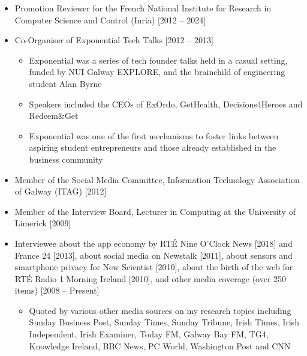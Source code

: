 \documentclass[10pt,a4paper]{res} %
\begin{document}
\begin{resume}
\begin{itemize}
\item Promotion Reviewer for the French National Institute for Research in Computer Science and Control (Inria) [2012 -- 2024]
\item Co-Organiser of Exponential Tech Talks [2012 -- 2013]
\begin{itemize} \itemsep -2pt
\item Exponential was a series of tech founder talks held in a casual setting, funded by NUI Galway EXPLORE, and the brainchild of engineering student Alan Byrne
\item Speakers included the CEOs of ExOrdo, GetHealth, Decisions4Heroes and Redeem\&Get
\item Exponential was one of the first mechanisms to foster links between aspiring student entrepreneurs and those already established in the business community
\end{itemize}
\item Member of the Social Media Committee, Information Technology Association of Galway (ITAG) [2012]
\item Member of the Interview Board, Lecturer in Computing at the University of Limerick [2009]
\item Interviewee about the app economy by RT\'{E} Nine O'Clock News [2018] and France 24 [2013], about social media on Newstalk [2011], about sensors and smartphone privacy for New Scientist [2010], about the birth of the web for RT\'{E} Radio 1 Morning Ireland [2010], and other media coverage (over 250 items) [2008 -- Present]
\begin{itemize} \itemsep -2pt
\item Quoted by various other media sources on my research topics including Sunday Business Post, Sunday Times, Sunday Tribune, Irish Times, Irish Independent, Irish Examiner, Today FM, Galway Bay FM, TG4, Knowledge Ireland, BBC News, PC World, Washington Post and CNN
\end{itemize}
\end{itemize}


\vspace{0.2in} %



\end{resume}
\end{document}

